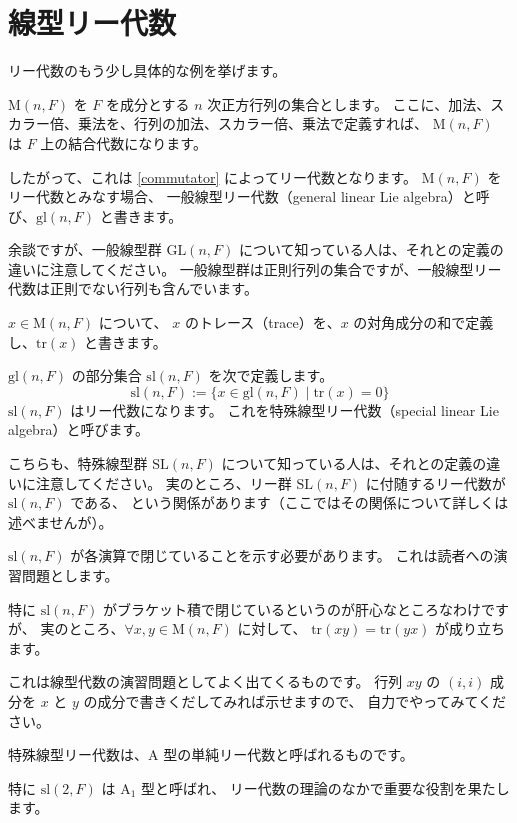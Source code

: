 \documentclass{ltjsarticle}
\renewenvironment{proof}{\begin{myproof}}{\end{myproof}}
\begin{document}
\section{線型リー代数}

リー代数のもう少し具体的な例を挙げます。

\begin{example}[一般線型リー代数]
    \(\mathrm{M}(n,F)\) を \(F\) を成分とする \(n\) 次正方行列の集合とします。
    ここに、加法、スカラー倍、乗法を、行列の加法、スカラー倍、乗法で定義すれば、
    \(\mathrm{M}(n,F)\) は \(F\) 上の結合代数になります。

    したがって、これは \cref{commutator} によってリー代数となります。
    \(\mathrm{M}(n,F)\) をリー代数とみなす場合、
    一般線型リー代数（general linear Lie algebra）と呼び、\(\mathrm{gl}(n,F)\) と書きます。
\end{example}

余談ですが、一般線型群 \(\mathrm{GL}(n,F)\) について知っている人は、それとの定義の違いに注意してください。
一般線型群は正則行列の集合ですが、一般線型リー代数は正則でない行列も含んでいます。

\begin{definition}[行列のトレース]
    \(x \in \mathrm{M}(n,F)\) について、
    \(x\) のトレース（trace）を、\(x\) の対角成分の和で定義し、\(\mathrm{tr}(x)\) と書きます。
\end{definition}

\begin{example}[特殊線型リー代数]
    \(\mathrm{gl}(n,F)\) の部分集合 \(\mathrm{sl}(n,F)\) を次で定義します。
    \[
        \mathrm{sl}(n,F) := \{x \in \mathrm{gl}(n,F) \mid \mathrm{tr}(x) = 0\}
    \]
    \(\mathrm{sl}(n,F)\) はリー代数になります。
    これを特殊線型リー代数（special linear Lie algebra）と呼びます。
\end{example}

こちらも、特殊線型群 \(\mathrm{SL}(n,F)\) について知っている人は、それとの定義の違いに注意してください。
実のところ、リー群 \(\mathrm{SL}(n,F)\) に付随するリー代数が \(\mathrm{sl}(n,F)\) である、
という関係があります（ここではその関係について詳しくは述べませんが）。

\begin{proof}
    \(\mathrm{sl}(n,F)\) が各演算で閉じていることを示す必要があります。
    これは読者への演習問題とします。
\end{proof}

特に \(\mathrm{sl}(n,F)\) がブラケット積で閉じているというのが肝心なところなわけですが、
実のところ、\(\forall x,y \in \mathrm{M}(n,F)\) に対して、
\(\mathrm{tr}(xy) = \mathrm{tr}(yx)\) が成り立ちます。

これは線型代数の演習問題としてよく出てくるものです。
行列 \(xy\) の \((i,i)\) 成分を \(x\) と \(y\) の成分で書きくだしてみれば示せますので、
自力でやってみてください。

特殊線型リー代数は、\(\mathrm{A}\) 型の単純リー代数と呼ばれるものです。

特に \(\mathrm{sl}(2,F)\) は \(\mathrm{A}_1\) 型と呼ばれ、
リー代数の理論のなかで重要な役割を果たします。
\end{document}
